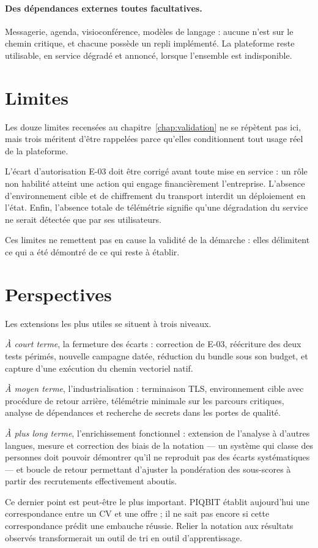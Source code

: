 \paragraph{Des dépendances externes toutes facultatives.} Messagerie, agenda,
visioconférence, modèles de langage : aucune n'est sur le chemin critique, et
chacune possède un repli implémenté. La plateforme reste utilisable, en service
dégradé et annoncé, lorsque l'ensemble est indisponible.

\section*{Limites}

Les douze limites recensées au chapitre~\ref{chap:validation} ne se répètent
pas ici, mais trois méritent d'être rappelées parce qu'elles conditionnent tout
usage réel de la plateforme.

L'écart d'autorisation E-03 doit être corrigé avant toute mise en service :
un rôle non habilité atteint une action qui engage financièrement
l'entreprise. L'absence d'environnement cible et de chiffrement du transport
interdit un déploiement en l'état. Enfin, l'absence totale de télémétrie
signifie qu'une dégradation du service ne serait détectée que par ses
utilisateurs.

Ces limites ne remettent pas en cause la validité de la démarche : elles
délimitent ce qui a été démontré de ce qui reste à établir.

\section*{Perspectives}

Les extensions les plus utiles se situent à trois niveaux.

\emph{À court terme}, la fermeture des écarts : correction de E-03, réécriture
des deux tests périmés, nouvelle campagne datée, réduction du bundle sous son
budget, et capture d'une exécution du chemin vectoriel natif.

\emph{À moyen terme}, l'industrialisation : terminaison TLS, environnement
cible avec procédure de retour arrière, télémétrie minimale sur les parcours
critiques, analyse de dépendances et recherche de secrets dans les portes de
qualité.

\emph{À plus long terme}, l'enrichissement fonctionnel : extension de l'analyse
à d'autres langues, mesure et correction des biais de la notation — un système
qui classe des personnes doit pouvoir démontrer qu'il ne reproduit pas des
écarts systématiques — et boucle de retour permettant d'ajuster la pondération
des sous-scores à partir des recrutements effectivement aboutis.

Ce dernier point est peut-être le plus important. PIQBIT établit aujourd'hui
une correspondance entre un CV et une offre ; il ne sait pas encore si cette
correspondance prédit une embauche réussie. Relier la notation aux résultats
observés transformerait un outil de tri en outil d'apprentissage.
